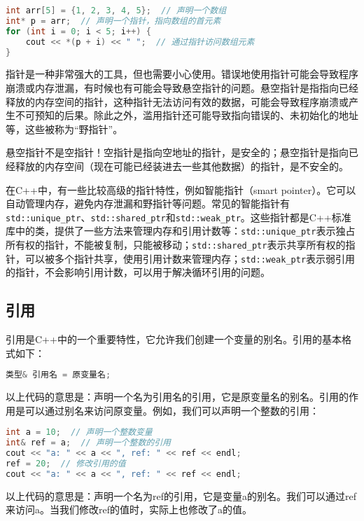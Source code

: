 \documentclass[../main.tex]{subfiles}
\begin{document}
\begin{lstlisting}[language=C++]
int arr[5] = {1, 2, 3, 4, 5};  // 声明一个数组
int* p = arr;  // 声明一个指针，指向数组的首元素
for (int i = 0; i < 5; i++) {
    cout << *(p + i) << " ";  // 通过指针访问数组元素
}
\end{lstlisting}

指针是一种非常强大的工具，但也需要小心使用。错误地使用指针可能会导致程序崩溃或内存泄漏，有时候也有可能会导致悬空指针的问题。悬空指针是指指向已经释放的内存空间的指针，这种指针无法访问有效的数据，可能会导致程序崩溃或产生不可预知的后果。除此之外，滥用指针还可能导致指向错误的、未初始化的地址等，这些被称为“野指针”。

\begin{tip}
  悬空指针不是空指针！空指针是指向空地址的指针，是安全的；悬空指针是指向已经释放的内存空间（现在可能已经装进去一些其他数据）的指针，是不安全的。
\end{tip}

在C++中，有一些比较高级的指针特性，例如智能指针（smart pointer）。它可以自动管理内存，避免内存泄漏和野指针等问题。常见的智能指针有\texttt{std::unique\_ptr}、\texttt{std::shared\_ptr}和\texttt{std::weak\_ptr}。这些指针都是C++标准库中的类，提供了一些方法来管理内存和引用计数等：\texttt{std::unique\_ptr}表示独占所有权的指针，不能被复制，只能被移动；\texttt{std::shared\_ptr}表示共享所有权的指针，可以被多个指针共享，使用引用计数来管理内存；\texttt{std::weak\_ptr}表示弱引用的指针，不会影响引用计数，可以用于解决循环引用的问题。

\subsection{引用}

引用是C++中的一个重要特性，它允许我们创建一个变量的别名。引用的基本格式如下：
\begin{lstlisting}[language=C++]
类型& 引用名 = 原变量名;
\end{lstlisting}
以上代码的意思是：声明一个名为引用名的引用，它是原变量名的别名。引用的作用是可以通过别名来访问原变量。例如，我们可以声明一个整数的引用：
\begin{lstlisting}[language=C++]
int a = 10;  // 声明一个整数变量
int& ref = a;  // 声明一个整数的引用
cout << "a: " << a << ", ref: " << ref << endl;
ref = 20;  // 修改引用的值
cout << "a: " << a << ", ref: " << ref << endl;
\end{lstlisting}

以上代码的意思是：声明一个名为ref的引用，它是变量a的别名。我们可以通过ref来访问a。当我们修改ref的值时，实际上也修改了a的值。
\end{document}
